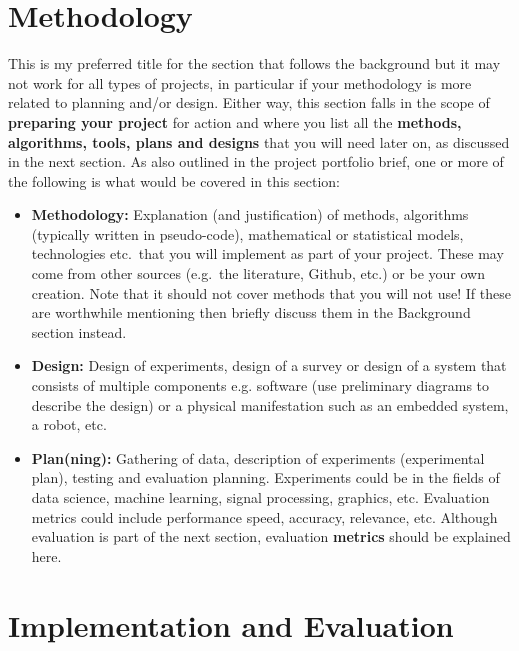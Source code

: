 \documentclass[final]{cmpreport_02}
\begin{document}
\section{Methodology}

This is my preferred title for the section that follows the background but it may not work for all types of projects, in particular if your methodology is more related to planning and/or design. Either way, this section falls in the scope of \textbf{preparing your project} for action and where you list all the \textbf{methods, algorithms, tools, plans and designs} that you will need later on, as discussed in the next section. As also outlined in the project portfolio brief, one or more of the following is what would be covered in this section:

\begin{itemize}
	\item \textbf{Methodology: } Explanation (and justification) of methods, algorithms (typically written in pseudo-code), mathematical or statistical models, technologies etc.\ that you will implement as part of your project. These may come from other sources (e.g.\ the literature, Github, etc.) or be your own creation. Note that it should not cover methods that you will not use! If these are worthwhile mentioning then briefly discuss them in the Background section instead.
	\item \textbf{Design: } Design of experiments, design of a survey or design of a system that consists of multiple components e.g. software (use preliminary diagrams to describe the design) or a physical manifestation such as an embedded system, a robot, etc.
	\item \textbf{Plan(ning): } Gathering of data, description of experiments (experimental plan), testing and evaluation planning. Experiments could be in the fields of data science, machine learning, signal processing, graphics, etc. Evaluation metrics could include performance speed, accuracy, relevance, etc. Although evaluation is part of the next section, evaluation \textbf{metrics} should be explained here.
\end{itemize}

\section{Implementation and Evaluation}
\end{document}

